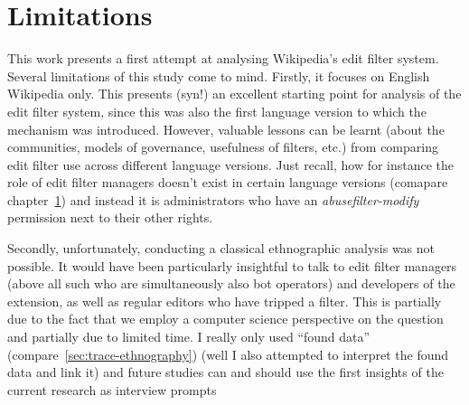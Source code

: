 \begin{comment}
Claudia: * A focus on the Good faith policies/guidelines is a historical development. After the huge surge in edits Wikipedia experienced starting 2005 the community needed a means to handle these (and the proportional amount of vandalism). They opted for automatisation. Automated system branded a lot of good faith edits as vandalism, which drove new comers away. A policy focus on good faith is part of the intentions to fix this.

 could be that the high hit count was made by false positives, which will have led to disabling the filter (TODO: that's a very interesting question actually; how do we know the high number of hits were actually leggit problems the filter wanted to catch and no false positives?)
--  we can't really? unless we study the edits themselves; I did this exemplarily for edits from the peak period in 2016; they were not false positives but a big spam wave.
\end{comment}



\section{Limitations}

This work presents a first attempt at analysing Wikipedia's edit filter system.
Several limitations of this study come to mind.
Firstly, it focuses on English Wikipedia only.
This presents (syn!) an excellent starting point for analysis of the edit filter system, since this was also the first language version to which the mechanism was introduced.
However, valuable lessons can be learnt (about the communities, models of governance, usefulness of filters, etc.) from comparing edit filter use across different language versions.
Just recall, how for instance the role of edit filter managers doesn't exist in certain language versions (comapare chapter~\ref{}) and instead it is administrators who have an \emph{abusefilter-modify} permission next to their other rights.

Secondly, unfortunately, conducting a classical ethnographic analysis was not possible.
It would have been particularly insightful to talk to edit filter managers (above all such who are simultaneously also bot operators) and developers of the extension, as well as regular editors who have tripped a filter.
This is partially due to the fact that we employ a computer science perspective on the question and partially due to limited time.
I really only used ``found data'' (compare~\ref{sec:trace-ethnography}) (well I also attempted to interpret the found data and link it) and future studies can and should use the first insights of the current research as interview prompts

